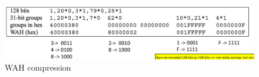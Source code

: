 \documentclass[a4paper]{scrreprt}
\begin{document}
\begin{figure}
		\centering
		\includegraphics[width=\textwidth]{resources/10_wah}
		\caption{WAH compression}
		\label{fig:wah}
\end{figure}


\printbibliography
\end{document}
